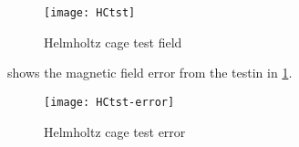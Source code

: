 \begin{figure}[htb]
    \centering
    \texttt{[image: HCtst]}
    \caption{Helmholtz cage test field}
    \label{fig:hc-tst}
\end{figure}

 shows the magnetic field error from the testin in \cref{fig:hc-tst}. 

\begin{figure}[htb]
    \centering
    \texttt{[image: HCtst-error]}
    \caption{Helmholtz cage test error}
    \label{fig:hc-tst-err}
\end{figure}

